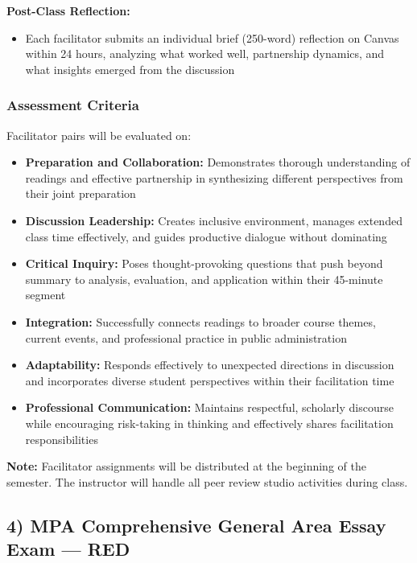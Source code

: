 \documentclass[11pt]{article}     %
\begin{document}
\textbf{Post-Class Reflection:}
\begin{itemize}
    \item Each facilitator submits an individual brief (250-word) reflection on Canvas within 24 hours, analyzing what worked well, partnership dynamics, and what insights emerged from the discussion
\end{itemize}

\subsubsection*{Assessment Criteria}

Facilitator pairs will be evaluated on:
\begin{itemize}
    \item \textbf{Preparation and Collaboration:} Demonstrates thorough understanding of readings and effective partnership in synthesizing different perspectives from their joint preparation
    \item \textbf{Discussion Leadership:} Creates inclusive environment, manages extended class time effectively, and guides productive dialogue without dominating
    \item \textbf{Critical Inquiry:} Poses thought-provoking questions that push beyond summary to analysis, evaluation, and application within their 45-minute segment
    \item \textbf{Integration:} Successfully connects readings to broader course themes, current events, and professional practice in public administration
    \item \textbf{Adaptability:} Responds effectively to unexpected directions in discussion and incorporates diverse student perspectives within their facilitation time
    \item \textbf{Professional Communication:} Maintains respectful, scholarly discourse while encouraging risk-taking in thinking and effectively shares facilitation responsibilities
\end{itemize}

\textbf{Note:} Facilitator assignments will be distributed at the beginning of the semester. The instructor will handle all peer review studio activities during class.

\subsection*{4) MPA Comprehensive General Area Essay Exam --- RED}
\end{document}
